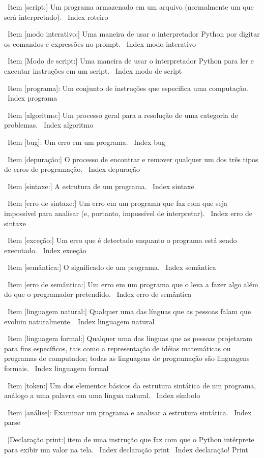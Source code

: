 \documentclass[10pt]{book}
\begin{document}
{\ Item [script:] Um programa armazenado em um arquivo (normalmente um que será
interpretado).
\ Index {} roteiro

\ Item [modo interativo:] Uma maneira de usar o interpretador Python por
digitar os comandos e expressões no prompt.
\ Index {modo interativo}

\ Item [Modo de script:] Uma maneira de usar o interpretador Python para ler
e executar instruções em um script.
\ Index {modo de script}

\ Item [programa]: Um conjunto de instruções que especifica uma computação.
\ Index {programa}

\ Item [algoritmo:] Um processo geral para a resolução de uma categoria de
problemas.
\ Index {algoritmo}

\ Item [bug]: Um erro em um programa.
\ Index {bug}

\ Item [depuração:] O processo de encontrar e remover qualquer um dos
três tipos de erros de programação.
\ Index {depuração}

\ Item [sintaxe:] A estrutura de um programa.
\ Index {} sintaxe

\ Item [erro de sintaxe:] Um erro em um programa que faz com que seja impossível
para analisar (e, portanto, impossível de interpretar).
\ Index {erro de sintaxe}

\ Item [exceção:] Um erro que é detectado enquanto o programa está sendo executado.
\ Index {exceção}

\ Item [semântica:] O significado de um programa.
\ Index {} semântica

\ Item [erro de semântica:] Um erro em um programa que o leva a fazer algo
além do que o programador pretendido.
\ Index {erro de semântica}

\ Item [linguagem natural:] Qualquer uma das línguas que as pessoas falam que
evoluiu naturalmente.
\ Index {linguagem natural}

\ Item [linguagem formal:] Qualquer uma das línguas que as pessoas projetaram
para fins específicos, tais como a representação de idéias matemáticas ou
programas de computador; todas as linguagens de programação são linguagens formais.
\ Index {linguagem formal}

\ Item [token:] Um dos elementos básicos da estrutura sintática de
um programa, análogo a uma palavra em uma língua natural.
\ Index {símbolo}

\ Item [análise]: Examinar um programa e analisar a estrutura sintática.
\ Index {} parse

\ [Declaração print:] item de uma instrução que faz com que o Python
intérprete para exibir um valor na tela.
\ Index {declaração print}
\ Index {declaração! Print}


}
\end{document}
